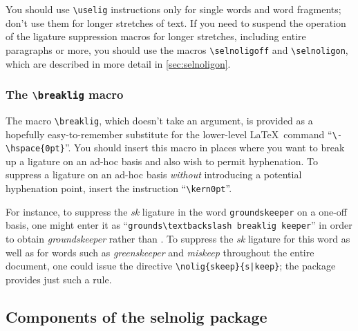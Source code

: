 \documentclass[11pt]{article}
\newcommand{\pkg}[1]{\textsf{#1}}
\newcommand{\cmmd}[1]{\texttt{\textbackslash #1}}
\begin{document}
You should use \cmmd{uselig} instructions only for single words and word fragments; don't use them for longer stretches of text. If you need to suspend the operation of the ligature suppression macros for longer stretches, including entire paragraphs or more, you should use the macros \cmmd{selnoligoff} and \cmmd{selnoligon}, which are described in more detail in \cref{sec:selnoligon}.



\subsubsection{The \cmmd{breaklig} macro} 
\label{sec:breaklig}

The macro \cmmd{breaklig}, which doesn't take an argument, is provided as a hopefully easy-to-remember substitute for the lower-level \LaTeX\ command ``\Verb+\-\hspace{0pt}+''. You should insert this macro in places where you want to break up a ligature on an ad-hoc basis and also wish to permit hyphenation. To suppress a ligature on an ad-hoc basis \emph{without} introducing a potential hyphenation point, insert the instruction \enquote{\cmmd{kern0pt}}. 

For instance, to suppress the {\ebg\emph{sk}} ligature in the word \Verb+groundskeeper+ on a one-off basis, one might enter it as \enquote{\Verb+grounds\textbackslash breaklig keeper+} in order to obtain \emph{\ebg groundskeeper} rather than \emph{\ebg {}}. To suppress the {\ebg \emph{sk}} ligature for this word as well as for words such as \emph{\ebg greenskeeper} and \emph{\ebg miskeep} throughout the entire document, one could issue the directive \Verb+\nolig{skeep}{s|keep}+; the package provides just such a rule.




\subsection[Components of the selnolig package]{Components of the \pkg{selnolig} package} 
\label{sec:components}
\end{document}
